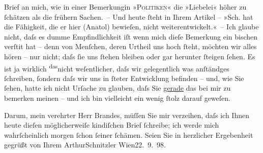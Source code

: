                Brief an mich, wie in einer Bemerkungin »\textsc{Politiken}« die »Liebelei« höher zu{ }ſchätzen als die
               frühern Sachen. – Und heute{ }ſteht in Ihrem Artikel – »Sch. hat die Fähigkeit, die er hier \introOben{}(Anatol)\introOben{} bewieſen, nicht weiterentwickelt.« – Ich glaube nicht, daſs es dumme
               Empfindlichkeit iſt wenn mich dieſe Bemerkung ein bischen verſti{\geminationm}t hat – denn von Menſchen, deren Urtheil uns hoch{ }ſteht, möchten wir alles hören – nur nicht; daſs{ }ſie uns{ }ſtehen bleiben oder gar
               herunter{ }ſteigen{ }ſehen. Es ist ja wirklich \substVorne{}\textsuperscript{das}\substDazwischen{}nicht\substHinten{} weſentlicher, daſs wir gelegentlich was anſtändges{ }ſchreiben,{ }ſondern {\pb}daſs wir uns in{ }ſteter Entwicklung befinden – und, wie
               Sie{ }ſehen, hatte ich nicht Urſache zu glauben, daſs Sie \uline{gerade} das bei mir zu bemerken meinen – und ich bin vielleicht ein wenig{ }ſtolz darauf geweſen.\pend
           
\pstart
           Darum, mein verehrter Herr Brandes, müſſen Sie mir verzeihen, daſs ich Ihnen heute
               dieſen möglicherweiſe kindiſchen Brief{ }ſchreibe; ich werde mich wahrſcheinlich morgen{ }ſchon{ }ſeiner{ }ſchämen.\pend
           \pstart Seien Sie in herzlicher Ergebenheit gegrüßt von Ihrem
                  \spacefill\mbox{ArthurSchnitzler}\pend{}
\pstart
           Wien22. 9. 98.\pend
           \endnumbering{}  \newcommand{\dateiname}{L00848}\newcommand{\titel}{Arthur Schnitzler an Georg Brandes, nicht abgesandt, 22. 9. 1898}\newcommand{\editorInnen}{Martin Anton Müller und Gerd-Hermann Susen}
